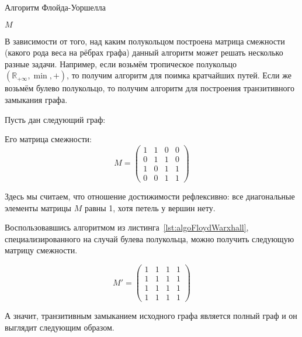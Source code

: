 \begin{algorithm}
\begin{algorithmic}[1]
\caption{Алгоритм Флойда-Уоршелла}
\label{lst:algoFloydWarxhall}
        \EndFor
      \EndFor
    \EndFor
\State \Return $M$
\EndFunction
\end{algorithmic}
\end{algorithm}

В зависимости от того, над каким полукольцом построена матрица смежности (какого рода веса на рёбрах графа) данный алгоритм может решать несколько разные задачи. Например, если возьмём тропическое полукольцо $(\mathbb{R}_{+\infty}, \min, +)$, то получим алгоритм для поимка кратчайших путей. Если же возьмём булево полукольцо, то получим алгоритм для построения транзитивного замыкания графа.

\begin{example}
  Пусть дан следующий граф:
  \begin{center}
    
  \end{center}

  Его матрица смежности:
  $$ M = 
  \begin{pmatrix}
    1 & 1 & 0 & 0 \\
    0 & 1 & 1 & 0 \\
    1 & 0 & 1 & 1 \\
    0 & 0 & 1 & 1
  \end{pmatrix}
  $$

  Здесь мы считаем, что отношение достижимости рефлексивно: все диагональные элементы матрицы $M$ равны 1, хотя петель у вершин нету. 

  Воспользовавшись алгоритмом из листинга~\ref{lst:algoFloydWarxhall}, специализированного на случай булева полукольца, можно получить следующую матрицу смежности.

  $$ M' = 
  \begin{pmatrix}
    1 & 1 & 1 & 1 \\
    1 & 1 & 1 & 1 \\
    1 & 1 & 1 & 1 \\
    1 & 1 & 1 & 1
  \end{pmatrix}
  $$

  А значит, транзитивным замыканием исходного графа является полный граф и он выглядит следующим образом.
  
  \begin{center}
    
  \end{center}

\end{example}

